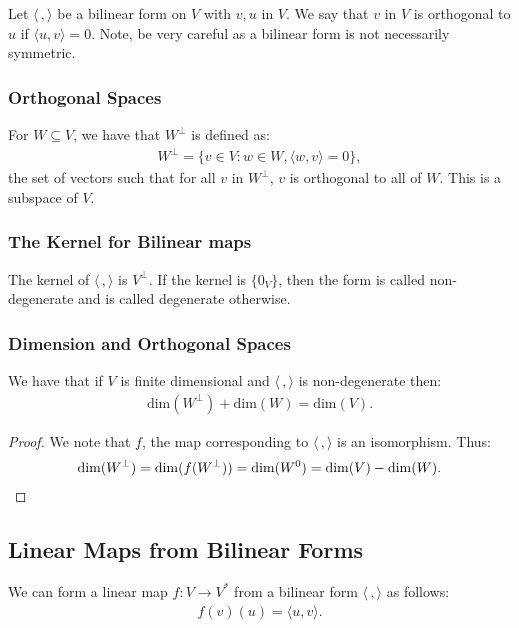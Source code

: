 Let $\langle \, , \rangle$ be a bilinear form on $V$ with $v, u$ in $V$. We say that $v$ in $V$ is 
orthogonal to $u$ if $\langle u, v \rangle = 0$. Note, be very careful as a bilinear form is not
necessarily symmetric.

\subsubsection{Orthogonal Spaces}

For $W \subseteq V$, we have that $W^\perp$ is defined as: \begin{gather*}
  W^\perp = \{v \in V : w \in W, \langle w, v \rangle = 0\},
\end{gather*} the set of vectors such that for all $v$ in $W^\perp$, $v$ is orthogonal
to all of $W$. This is a subspace of $V$.

\subsubsection{The Kernel for Bilinear maps}

The kernel of $\langle \, , \rangle$ is $V^\perp$. If the kernel is $\{0_V\}$,
then the form is called non-degenerate and is called degenerate otherwise.

\subsubsection{Dimension and Orthogonal Spaces}

We have that if $V$ is finite dimensional and $\langle \, , \rangle$ is non-degenerate
then: \begin{gather*}
  \text{dim}(W^\perp) + \text{dim}(W) = \text{dim}(V).
\end{gather*}
\begin{proof}
    We note that $f$, the map corresponding to $\langle \, , \rangle$
    is an isomorphism. Thus: \begin{gather*}
        \operatorname{dim}(W^\perp) = \operatorname{dim}(f(W^\perp)) = \operatorname{dim}(W^0) = \operatorname{dim}(V) - \operatorname{dim}(W). \qedhere
    \end{gather*}
\end{proof}

\subsection{Linear Maps from Bilinear Forms}

We can form a linear map $f : V \to V^*$ from a bilinear form $\langle \, , \rangle$ 
as follows: \begin{gather*}
  f(v)(u) = \langle u, v \rangle.
\end{gather*}

